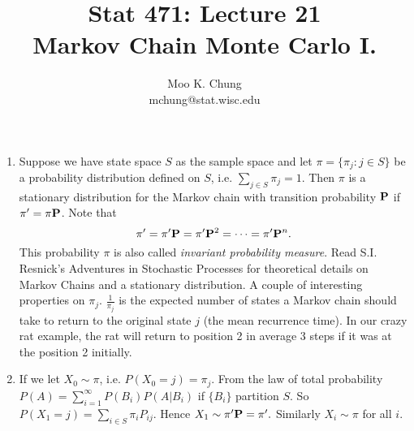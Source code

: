 \documentclass[12pt,twocolumn]{article} %
\begin{document}
\title{Stat 471: Lecture 21\\
Markov Chain Monte Carlo I.}
\author{Moo K. Chung\\
mchung@stat.wisc.edu}
\maketitle \thispagestyle{empty}
\begin{enumerate} 

\item  Suppose we have state space $S$ as the sample space and let $\pi =\{\pi_j: j \in S\}$ be a probability distribution defined on $S$, i.e. $\sum _{j \in S} \pi_j =1$. Then $\pi$ is a stationary distribution for the Markov chain with transition probability ${\bf P}$ if $\pi' = \pi{\bf P}$. Note that
$$\pi' = \pi'{\bf P} = \pi'{\bf P}^2 = \cdots = \pi'{\bf P}^n.$$
This probability $\pi$ is also called {\em invariant probability measure}. Read S.I. Resnick's Adventures in Stochastic Processes for theoretical details on Markov Chains and a stationary distribution.
A couple of interesting properties on $\pi_j$. $\frac{1}{\pi_j}$ is
the expected number of states a Markov chain should take to return to
the original state $j$ (the mean recurrence time). In our crazy rat example, the rat will return to position 2 in average 3 steps if it was at the position 2 initially.

\item If we let $X_0 \sim \pi$, i.e. $P(X_0=j) = \pi_j$. From the law of total probability
$P(A)=\sum_{i=1}^{\infty} P(B_i)P(A|B_i)$ if $\{ B_i \}$ partition $S$.
So $P(X_1=j) = \sum_{i \in S} \pi_i P_{ij}$. Hence $X_1 \sim \pi'{\bf P} =\pi'.$
Similarly $X_i \sim \pi$ for all $i$.


\end{enumerate}
\end{document}
